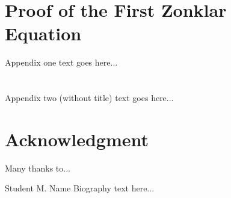 \documentclass[journal]{./IEEE/IEEEtran}
\begin{document}
\appendices

\section{Proof of the First Zonklar Equation}
Appendix one text goes here...

\section{}
Appendix two (without title) text goes here...

\section*{Acknowledgment}
Many thanks to...




\begin{biography}{Student M. Name}
Biography text here...
\end{biography}
\end{document}
